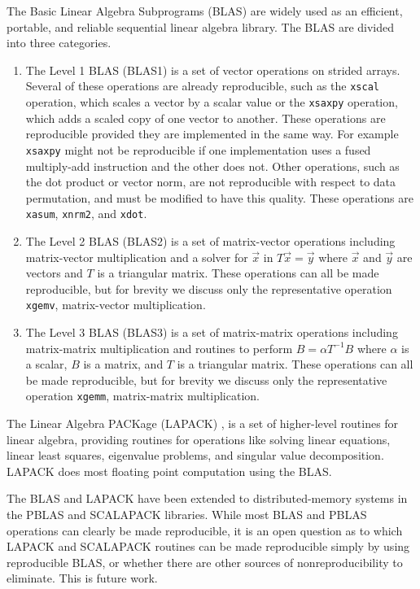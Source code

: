   The Basic Linear Algebra Subprograms (BLAS) \cite{BLAS} are widely
  used as an efficient, portable, and reliable sequential linear algebra library.
  The BLAS are divided into three categories.
  \begin{enumerate}
    \item The Level 1 BLAS (BLAS1) is a set of vector operations on
      strided arrays. Several of these operations are already
      reproducible, such as the \texttt{xscal} operation, which scales a vector by a scalar value or the \texttt{xsaxpy} operation, which adds a scaled copy of one vector to another. These operations are reproducible provided they are implemented in the same way. For example \texttt{xsaxpy} might not be reproducible if one implementation uses a fused multiply-add instruction and the other does not. Other operations, such as
      the dot product or vector norm, are not reproducible with
      respect to data permutation, and must be modified to have this quality. These operations
      are \texttt{xasum}, \texttt{xnrm2}, and 
      \texttt{xdot}.
    \item The Level 2 BLAS (BLAS2) is a set of matrix-vector operations
      including matrix-vector multiplication and a solver for $\vec{x}$ in $T\vec{x} = \vec{y}$ where $\vec{x}$ and $\vec{y}$ are vectors and $T$ is a triangular matrix. These operations can all be made reproducible, but for brevity we discuss only the representative operation \texttt{xgemv}, matrix-vector multiplication.
    \item The Level 3 BLAS (BLAS3) is a set of matrix-matrix operations
      including matrix-matrix multiplication and routines to perform $B = \alpha T^{-1}B$ where $\alpha$ is a scalar, $B$ is a matrix, and $T$ is a triangular matrix. These operations can all be made reproducible, but for brevity we discuss only the representative operation \texttt{xgemm}, matrix-matrix multiplication.
  \end{enumerate}

  The Linear Algebra PACKage (LAPACK) \cite{LAPACK}, is a set of higher-level
  routines for linear algebra, providing routines for operations like solving linear equations, linear least squares, eigenvalue problems, and singular value decomposition. LAPACK does most floating point computation using the BLAS.

  The BLAS and LAPACK have been extended to distributed-memory systems in the PBLAS \cite{PBLAS} and SCALAPACK \cite{SCALAPACK} libraries. While most BLAS and PBLAS operations can clearly be made reproducible, it is an open question as to which LAPACK and SCALAPACK routines can be made reproducible simply by using reproducible BLAS, or whether there are other sources of nonreproducibility to eliminate. This is future work.

